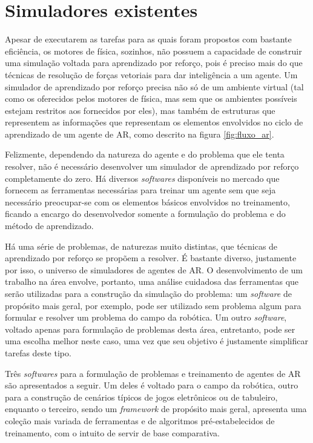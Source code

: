 \documentclass[cic,tc]{iiufrgs}
\begin{document}
\section{Simuladores existentes}
Apesar de executarem as tarefas para as quais foram propostos com bastante
eficiência, os motores de física, sozinhos, não possuem a capacidade de
construir uma simulação voltada para aprendizado por reforço, pois é preciso
mais do que técnicas de resolução de forças vetoriais para dar inteligência a um
agente. Um simulador de aprendizado por reforço precisa não só de um ambiente
virtual (tal como os oferecidos pelos motores de física, mas sem que os
ambientes possíveis estejam restritos aos fornecidos por eles), mas também de
estruturas que representem as informações que representam os elementos
envolvidos no ciclo de aprendizado de um agente de AR, como descrito na figura
\ref{fig:fluxo_ar}.


Felizmente, dependendo da natureza do agente e do problema que ele tenta
resolver, não é necessário desenvolver um simulador de aprendizado por reforço
completamente do zero. Há diversos \textit{softwares} disponíveis no mercado que
fornecem as ferramentas necessárias para treinar um agente sem que seja
necessário preocupar-se com os elementos básicos envolvidos no treinamento,
ficando a encargo do desenvolvedor somente a formulação do problema e do método
de aprendizado.


Há uma série de problemas, de naturezas muito distintas, que técnicas de
aprendizado por reforço se propõem a resolver. É bastante diverso, justamente
por isso, o universo de simuladores de agentes de AR. O desenvolvimento de um
trabalho na área envolve, portanto, uma análise cuidadosa das ferramentas que
serão utilizadas para a construção da simulação do problema: um
\textit{software} de propósito mais geral, por exemplo, pode ser utilizado sem
problema algum para formular e resolver um problema do campo da robótica. Um
outro \textit{software}, voltado apenas para formulação de problemas desta área,
entretanto, pode ser uma escolha melhor neste caso, uma vez que seu objetivo é
justamente simplificar tarefas deste tipo.


Três \textit{softwares} para a formulação de problemas e treinamento de agentes
de AR são apresentados a seguir. Um deles é voltado para o campo da robótica,
outro para a construção de cenários típicos de jogos eletrônicos ou de
tabuleiro, enquanto o terceiro, sendo um \textit{framework} de propósito mais
geral, apresenta uma coleção mais variada de ferramentas e de algoritmos
pré-estabelecidos de treinamento, com o intuito de servir de base comparativa.
\end{document}
